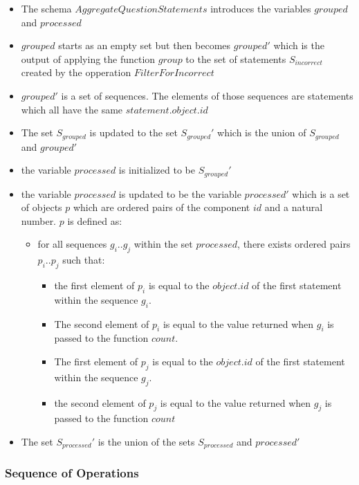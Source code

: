 \documentclass{article}
\begin{document}
\begin{itemize}
\item The schema $AggregateQuestionStatements$ introduces the variables
  $grouped$ and $processed$
\item $grouped$ starts as an empty set but then becomes $grouped'$
  which is the output of applying the function $group$ to the set of statements
  $S_{incorrect}$ created by the opperation $FilterForIncorrect$
\item $grouped'$ is a set of sequences. The elements of those
  sequences are statements which all have the same $statement.object.id$
\item The set $S_{grouped}$ is updated to the set $S_{grouped}'$ which
  is the union of $S_{grouped}$ and $grouped'$
\item the variable $processed$ is initialized to be $S_{grouped}'$
\item the variable $processed$ is updated to be the variable
  $processed'$ which is a set of objects $p$ which are ordered pairs
  of the component $id$ and a natural number. $p$ is defined as:
  \begin{itemize}
  \item for all sequences $g_{i}..g_{j}$ within the set $processed$,
    there exists ordered pairs $p_{i}..p_{j}$ such that:
    \begin{itemize}
    \item the first element of $p_{i}$ is equal to the $object.id$ of the first
      statement within the sequence $g_{i}$.
    \item The second element of $p_{i}$ is equal to the value returned
      when $g_{i}$ is passed to the function $count$.
    \item The first element of $p_{j}$ is equal to the $object.id$ of the
      first statement within the sequence $g_{j}$.
    \item the second element of $p_{j}$ is equal to the value returned
      when $g_{j}$ is passed to the function $count$
    \end{itemize}
  \end{itemize}
  \item The set $S_{processed}'$ is the union of the sets
    $S_{processed}$ and $processed'$
\end{itemize}

\subsubsection{Sequence of Operations}
\end{document}
